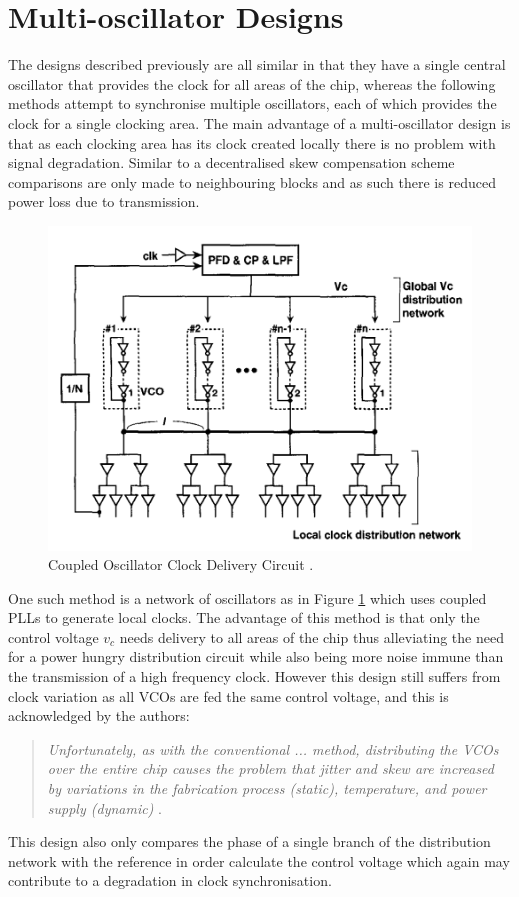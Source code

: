 \documentclass[11pt,english,british]{report}
\begin{document}
\section{Multi-oscillator Designs}
The designs described previously are all similar in that they have a single central oscillator that provides the clock for all areas of the chip, whereas the following methods attempt to synchronise multiple oscillators, each of which provides the clock for a single clocking area. The main advantage of a multi-oscillator design is that as each clocking area has its clock created locally there is no problem with signal degradation. Similar to a decentralised skew compensation scheme comparisons are only made to neighbouring blocks and as such there is reduced power loss due to transmission.
\begin{figure}[h]
	\centering
	\includegraphics[scale=0.5]{../mizuno1998noise}
	\caption{Coupled Oscillator Clock Delivery Circuit \cite{mizuno1998noise}.}
	\label{fig:mizuno1998noise}
\end{figure}
One such method is a network of oscillators as in Figure \ref{fig:mizuno1998noise} which uses coupled PLLs to generate local clocks. The advantage of this method is that only the control voltage $v_c$ needs delivery to all areas of the chip thus alleviating the need for a power hungry distribution circuit while also being more noise immune than the transmission of a high frequency clock. However this design still suffers from clock variation as all VCOs are fed the same control voltage, and this is acknowledged by the authors:
\begin{quotation}
	\singlespacing
	\textit{Unfortunately, as with the conventional ... method, distributing the VCOs over the entire chip causes the problem that jitter and skew are increased by variations in the fabrication process (static), temperature, and power supply (dynamic)} \cite{mizuno1998noise}.
	\doublespacing
\end{quotation}
This design also only compares the phase of a single branch of the distribution network with the reference in order calculate the control voltage which again may contribute to a degradation in clock synchronisation. %
\end{document}
